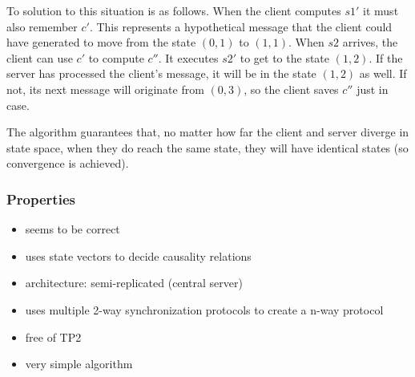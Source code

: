 To solution to this situation is as follows. When the client computes $s1'$ it must also remember $c'$. This represents a hypothetical message that the client could have generated to move from the state $(0,1)$ to $(1,1)$. When $s2$ arrives, the client can use $c'$ to compute $c''$. It executes $s2'$ to get to the state $(1,2)$. If the server has processed the client's message, it will be in the state $(1,2)$ as well. If not, its next message will originate from $(0,3)$, so the client saves $c''$ just in case.

The algorithm guarantees that, no matter how far the client and server diverge in state space, when they do reach the same state, they will have identical states (so convergence is achieved).


\subsubsection{Properties}
\begin{itemize}
 \item seems to be correct
 \item uses state vectors to decide causality relations
 \item architecture: semi-replicated (central server)
 \item uses multiple 2-way synchronization protocols to create a n-way protocol
 \item free of TP2
 \item very simple algorithm
\end{itemize}
